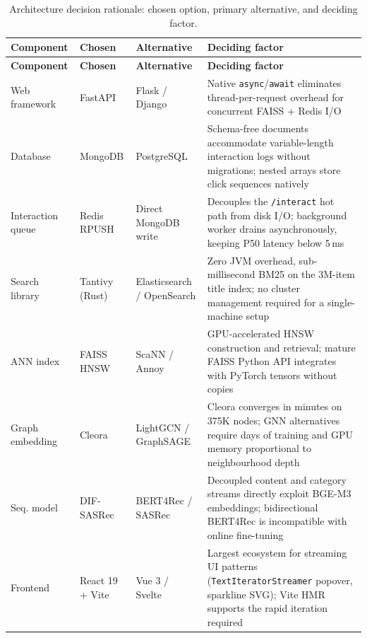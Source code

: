 \begin{longtable}{p{3.2cm} p{2.8cm} p{2.8cm} p{4.2cm}}
\caption{Architecture decision rationale: chosen option, primary alternative, and deciding factor.}
\label{tab:tech_rationale} \\
\hline
\textbf{Component} & \textbf{Chosen} & \textbf{Alternative} & \textbf{Deciding factor} \\
\hline
\endfirsthead
\hline
\textbf{Component} & \textbf{Chosen} & \textbf{Alternative} & \textbf{Deciding factor} \\
\hline
\endhead
\hline
\endfoot
\hline
\endlastfoot
Web framework    & FastAPI       & Flask / Django     & Native \texttt{async}/\texttt{await} eliminates thread-per-request overhead for concurrent FAISS + Redis I/O \\
\hline
Database         & MongoDB       & PostgreSQL         & Schema-free documents accommodate variable-length interaction logs without migrations; nested arrays store click sequences natively \\
\hline
Interaction queue & Redis RPUSH  & Direct MongoDB write & Decouples the \texttt{/interact} hot path from disk I/O; background worker drains asynchronously, keeping P50 latency below 5\,ms \\
\hline
Search library   & Tantivy (Rust) & Elasticsearch / OpenSearch & Zero JVM overhead, sub-millisecond BM25 on the 3M-item title index; no cluster management required for a single-machine setup \\
\hline
ANN index        & FAISS HNSW    & ScaNN / Annoy      & GPU-accelerated HNSW construction and retrieval; mature FAISS Python API integrates with PyTorch tensors without copies \\
\hline
Graph embedding  & Cleora        & LightGCN / GraphSAGE & Cleora converges in minutes on 375K nodes; GNN alternatives require days of training and GPU memory proportional to neighbourhood depth \\
\hline
Seq. model       & DIF-SASRec    & BERT4Rec / SASRec  & Decoupled content and category streams directly exploit BGE-M3 embeddings; bidirectional BERT4Rec is incompatible with online fine-tuning \\
\hline
Frontend         & React 19 + Vite & Vue 3 / Svelte   & Largest ecosystem for streaming UI patterns (\texttt{TextIteratorStreamer} popover, sparkline SVG); Vite HMR supports the rapid iteration required \\
\end{longtable}

